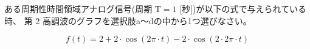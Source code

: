 ある周期性時間領域アナログ信号(周期 $\textrm{T} = 1$ [秒])が以下の式で与えられている時、
第 $2$ 高調波のグラフを選択肢a〜dの中から1つ選びなさい。

\[
f(t) = 
2
+ 2 \cdot \cos( 2 \pi \cdot t )
- 2 \cdot \cos( 2 \cdot 2 \pi \cdot t )
\]
